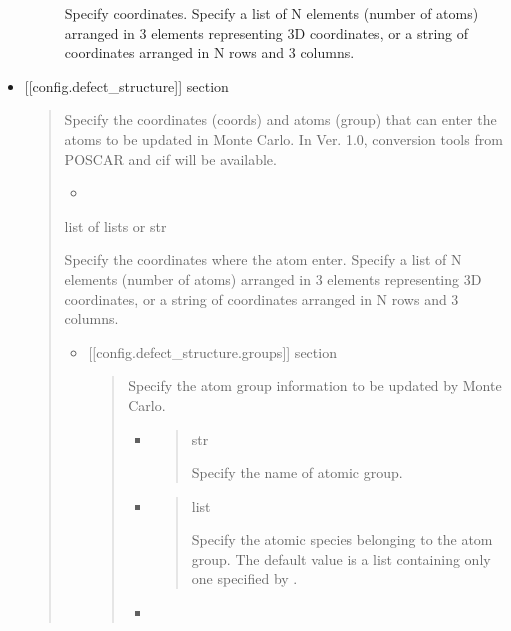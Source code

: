 \documentclass[letterpaper,10pt,english]{sphinxmanual}
\begin{document}
\begin{itemize}
\begin{description}
Specify coordinates. Specify a list of N elements (number of atoms) arranged in 3 elements representing 3D coordinates, or a string of coordinates arranged in N rows and 3 columns.

\end{description}

\item {} 
{[}{[}config.defect\_structure{]}{]} section
\begin{quote}

Specify the coordinates (coords) and atoms (group) that can enter the atoms to be updated in Monte Carlo.
In Ver. 1.0, conversion tools from POSCAR and cif will be available.
\begin{itemize}
\item {} 

\end{itemize}

 list of lists or str

  Specify the coordinates where the atom enter.
Specify a list of N elements (number of atoms) arranged in 3 elements representing 3D coordinates, or a string of coordinates arranged in N rows and 3 columns.
\begin{itemize}
\item {} 
{[}{[}config.defect\_structure.groups{]}{]} section
\begin{quote}

Specify the atom group information to be updated by Monte Carlo.
\begin{itemize}
\item {} 
\begin{quote}

 str

Specify the name of atomic group.
\end{quote}

\item {} 
\begin{quote}

 list

Specify the atomic species belonging to the atom group. The default value is a list containing only one specified by .
\end{quote}

\item {} 
\begin{quote}


\end{quote}
\end{itemize}
\end{quote}
\end{itemize}
\end{quote}
\end{itemize}
\end{document}
